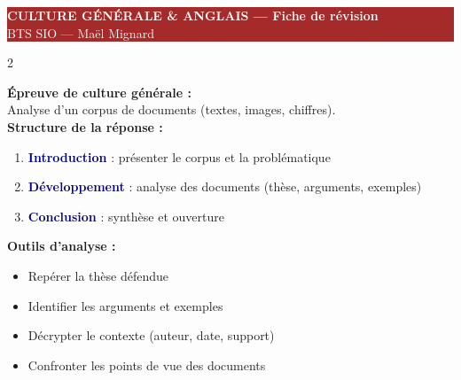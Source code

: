 \documentclass[a4paper,10pt]{article}
\newcommand{\key}[1]{\textbf{\textcolor{navy}{#1}}}
\begin{document}
\begin{center}
  \colorbox{brown}{\parbox{\dimexpr\textwidth-2\fboxsep}{
    \centering\vspace{3pt}
    {\LARGE\bfseries\textcolor{white}{CULTURE GÉNÉRALE \& ANGLAIS — Fiche de révision}}\\
    {\normalsize\textcolor{white}{BTS SIO — Maël Mignard}}
    \vspace{3pt}
  }}
\end{center}
\vspace{6pt}

\begin{multicols}{2}

\begin{tcolorbox}[basebox, colframe=brown, title=1. Culture G — Méthodologie]
\textbf{Épreuve de culture générale :}\\
Analyse d'un corpus de documents (textes, images, chiffres).\\[4pt]
\textbf{Structure de la réponse :}
\begin{enumerate}
  \item \key{Introduction} : présenter le corpus et la problématique
  \item \key{Développement} : analyse des documents (thèse, arguments, exemples)
  \item \key{Conclusion} : synthèse et ouverture
\end{enumerate}
\vspace{4pt}
\textbf{Outils d'analyse :}
\begin{itemize}
  \item Repérer la thèse défendue
  \item Identifier les arguments et exemples
  \item Décrypter le contexte (auteur, date, support)
  \item Confronter les points de vue des documents
\end{itemize}
\end{tcolorbox}


\end{multicols}
\end{document}
